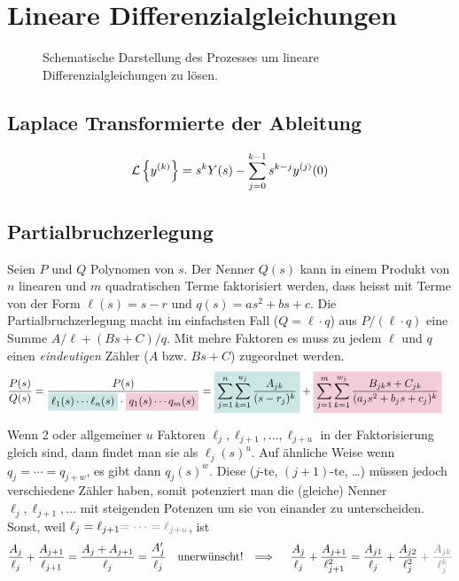 \section{Lineare Differenzialgleichungen}
\begin{figure}[H] \centering
  
  \caption{
    Schematische Darstellung des Prozesses um lineare Differenzialgleichungen
    zu l\"osen.
  }
\end{figure}

\subsection{Laplace Transformierte der Ableitung}
\[
  \mathcal{L}\left\{ y^{(k)} \right\} =
  s^k Y(s) - \sum_{j = 0}^{k - 1} s^{k-j} y^{(j)}(0)
\]

\subsection{Partialbruchzerlegung}
Seien \(P\) und \(Q\) Polynomen von \(s\).
Der Nenner \(Q(s)\) kann in einem Produkt von \(n\) linearen und \(m\)
quadratischen Terme faktorisiert werden, dass heisst mit Terme von der Form
\(\ell (s) = s - r\) und \(q(s) = a s^2 + b s + c\).
%
Die Partialbruchzerlegung macht im einfachsten Fall (\(Q = \ell\cdot q\)) aus
\(P/(\ell \cdot q)\) eine Summe \(A/\ell + (Bs + C)/q\). Mit mehre Faktoren es
muss zu jedem \(\ell\) und \(q\) einen \emph{eindeutigen} Z\"ahler (\(A\) bzw.
\(Bs + C\)) zugeordnet werden.
%
\begin{align*}
  \frac{P(s)}{Q(s)}
  =
  \frac{P(s)}{
    \colorbox{teal!20}{\(
      \ell_1(s)\cdots \ell_n(s)
    \)}
    \cdot
    \colorbox{purple!20}{\(
      q_1(s)\cdots q_m(s)
    \)}
  }
  &=
  \colorbox{teal!20}{\(\displaystyle
    \sum_{j=1}^n \sum_{k=1}^{u_j} \frac{A_{jk}}{(s - r_j)^k}
  \)}
  +
  \colorbox{purple!20}{\(\displaystyle
    \sum_{j=1}^m \sum_{k=1}^{w_j} \frac{B_{jk} s + C_{jk}}{(a_j s^2 + b_j s + c_j)^k}
  \)}
\end{align*}

Wenn 2 oder allgemeiner \(u\) Faktoren \(\ell_j, \ell_{j+1},\dots,\ell_{j+u}\)
in der Faktorisierung gleich sind, dann findet man sie als \(\ell_j(s)^{u}\).
Auf \"ahnliche Weise wenn \(q_j = \cdots = q_{j+w}\), es gibt dann
\(q_j(s)^{w}\).
%
Diese (\(j\)-te, \((j+1)\)-te, \dots) m\"ussen jedoch verschiedene Z\"ahler haben,
somit potenziert man die (gleiche) Nenner \(\ell_j, \ell_{j+1}, \dots\) mit steigenden Potenzen 
um sie von einander zu unterscheiden.
Sonst, weil
\(\ell_j = \ell_{j+1} \textcolor{gray}{= \cdots = \ell_{j+u}}\), ist
\begin{align*}
  \frac{A_j}{\ell_j} + \frac{A_{j+1}}{\ell_{j+1}} =
    \frac{A_j + A_{j+1}}{\ell_j} = \frac{A'_j}{\ell_j}
  \quad\text{unerw\"unscht! }\implies\quad
  \frac{A_j}{\ell_j} + \frac{A_{j+1}}{\ell_{j+1}^2} =
    \frac{A_{j1}}{\ell_j} + \frac{A_{j2}}{\ell_j^2}
      \begingroup\color{gray}
        + \frac{A_{jk}}{\ell_j^k}
      \endgroup
\end{align*}

